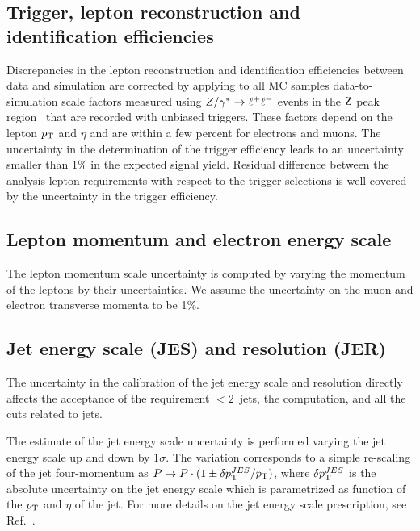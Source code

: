 \subsection{Trigger, lepton reconstruction and identification efficiencies}
Discrepancies in the lepton reconstruction and identification
efficiencies between data and simulation are corrected by applying
to all MC samples data-to-simulation scale factors measured using $Z/\gamma^*\to\ell^+\ell^-$ 
events in the $\mathrm{Z}$ peak region~\cite{wzxs} that are recorded with unbiased triggers. 
These factors depend on the lepton $p_{\mathrm{T}}$ and $\eta$ and are within a few percent for electrons and muons.
The uncertainty in the determination of the trigger efficiency leads to an uncertainty 
smaller than 1\% in the expected signal yield. Residual difference between the analysis 
lepton requirements with respect to the trigger selections is well covered by 
the uncertainty in the trigger efficiency. 

\subsection{Lepton momentum and electron energy scale}

The lepton momentum scale uncertainty is computed by varying the
momentum of the leptons by their uncertainties. We assume 
the uncertainty on the muon and electron transverse momenta to be 1\%.

\subsection{Jet energy scale (JES) and resolution (JER)}

The uncertainty in the calibration of the jet energy scale and resolution
directly affects the acceptance of the requirement $< 2$~jets, 
the \ETm computation, and all the cuts related to jets. 

The estimate of the jet energy scale uncertainty is performed varying the jet energy scale up and down by 1$\sigma$.
The variation corresponds to a simple re-scaling of the jet four-momentum as
$P\rightarrow P \cdot (1 \pm \delta p_{\mathrm{T}}^{JES}/{p_{\mathrm{T}}})$, where 
$\delta p_{\mathrm{T}}^{JES}$ is the absolute uncertainty on the jet energy scale
which is parametrized as function of the $p_{\mathrm{T}}$ and $\eta$ of the jet. 
For more details on the jet energy scale prescription, see Ref.~\cite{JES2011}. 

